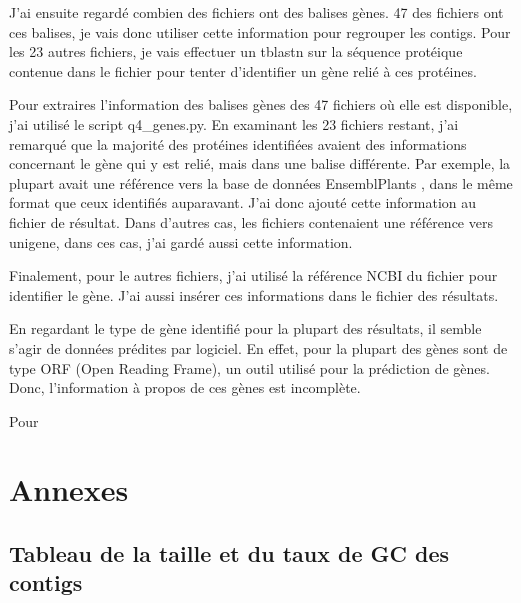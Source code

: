 \documentclass[10.9pt]{article} %
\renewcommand{\thesubsection}{\alph{subsection}}
\begin{document}
J'ai ensuite regardé combien des fichiers ont des balises gènes. 47 des fichiers ont ces balises, je
vais donc utiliser cette information pour regrouper les contigs. Pour les 23 autres fichiers, je vais
effectuer un tblastn sur la séquence protéique contenue dans le fichier pour tenter d'identifier un
gène relié à ces protéines.

Pour extraires l'information des balises gènes des 47 fichiers où elle est disponible, j'ai utilisé le
script q4\_genes.py. En examinant les 23 fichiers restant, j'ai remarqué que la majorité des protéines
identifiées avaient des informations concernant le gène qui y est relié, mais dans une balise différente.
Par exemple, la plupart avait une référence vers la base de données EnsemblPlants \cite{ENSEMBL}, dans le même format
que ceux identifiés auparavant. J'ai donc ajouté cette information au fichier de résultat. Dans d'autres
cas, les fichiers contenaient une référence vers unigene, dans ces cas, j'ai gardé aussi cette information.

Finalement, pour le autres fichiers, j'ai utilisé la référence NCBI du fichier pour identifier le gène. J'ai aussi
insérer ces informations dans le fichier des résultats.

En regardant le type de gène identifié pour la plupart des résultats, il semble s'agir de données prédites par logiciel.
En effet, pour la plupart des gènes sont de type ORF (Open Reading Frame), un outil utilisé pour la prédiction de gènes.
Donc, l'information à propos de ces gènes est incomplète.

Pour 




\begingroup
\renewcommand{\appendix}{%
    \renewcommand{\thesubsection}{\arabic{subsection}}
}

\newpage
\appendix
\section{Annexes}

\subsection{Tableau de la taille et du taux de GC des contigs}\label{1}
\end{document}

